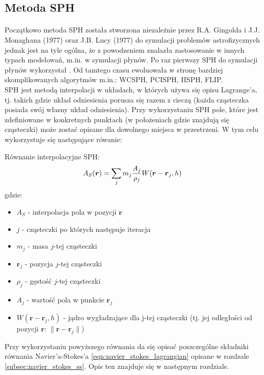 \subsection{Metoda SPH}
\paragraph{}
Początkowo metoda SPH została stworzona niezależnie przez R.A. Gingolda i J.J. Monaghana (1977) oraz J.B. Lucy (1977) do symulacji problemów astrofizycznych jednak jest na tyle ogólna, że z powodzeniem znalazła zastosowanie w innych typach modelowań, m.in. w symulacji płynów. Po raz pierwszy SPH do symulacji płynów wykorzystał \cite{muller03}. Od tamtego czasu ewoluowała w stronę bardziej skomplikowanych algorytmów m.in.: WCSPH, PCISPH, IISPH, FLIP.\\
SPH jest metodą interpolacji w układach, w których używa się opisu Lagrange'a, tj. takich gdzie układ odniesienia porusza się razem z cieczą (każda cząsteczka posiada swój własny układ odniesienia). Przy wykorzystaniu SPH pole, które jest zdefiniowane w konkretnych punktach (w położeniach gdzie znajdują się cząsteczki) może zostać opisane dla dowolnego miejsca w przestrzeni. W tym celu wykorzystuje się następujące rówanie:\\

\begin{samepage}
{\sc Równanie interpolacyjne SPH: }
\begin{equation}
A_S(\boldsymbol{r}) = \sum\limits_{j} m_j {A_j \over\rho_j}W(\boldsymbol{r}-\boldsymbol{r}_j, h)
\label{eqn:sph}
\end{equation}
gdzie:

\begin{itemize}[noitemsep,topsep=0pt,parsep=0pt,partopsep=0pt]
\renewcommand\labelitemi{--}
\item $ A_S $ - interpolacja pola w pozycji $\boldsymbol{r}$
\item $j$ - cząsteczki po których następuje iteracja
\item $m_j$ - masa $j$-tej cząsteczki
\item $\boldsymbol{r}_j$ - pozycja $j$-tej cząsteczki
\item $\rho_j$ - gęstość $j$-tej cząsteczki
\item $A_j$ - wartość pola w punkcie $\boldsymbol{r}_j$
\item $W(\boldsymbol{r}-\boldsymbol{r}_j, h)$ - jądro wygładzające dla j-tej cząsteczki (tj. jej odległości od pozycji $\boldsymbol{r}$: $\| \boldsymbol{r}-\boldsymbol{r}_j \|$)
\end{itemize}
\end{samepage}
\vspace{3ex}
Przy wykorzystaniu powyższego równania da się opisać poszczególne składniki równania Navier'a-Stokes'a \eqref{eqn:navier_stokes_lagrangian} opisane w rozdzale \eqref{subsec:navier_stokes_ss}. Opis ten znajduje się w następnym rozdziale.
\par

